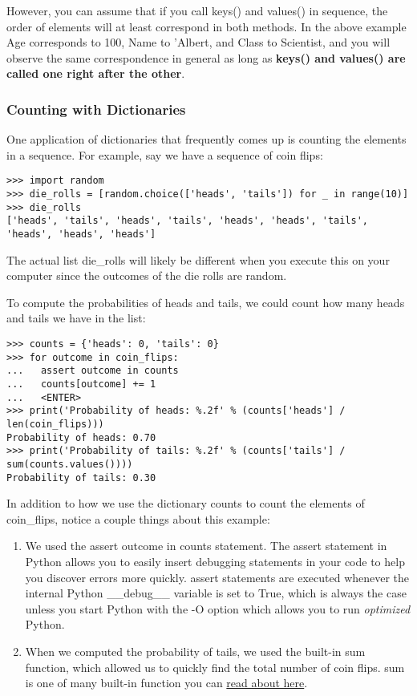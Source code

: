 However, you can assume that if you call keys() and values() in
sequence, the order of elements will at least correspond in both
methods. In the above example Age corresponds to 100, Name to 'Albert,
and Class to Scientist, and you will observe the same correspondence in
general as long as \textbf{keys() and values() are called one right
after the other}.

\subsubsection{Counting with
Dictionaries}\label{counting-with-dictionaries}

One application of dictionaries that frequently comes up is counting the
elements in a sequence. For example, say we have a sequence of coin
flips:

\begin{verbatim}
>>> import random
>>> die_rolls = [random.choice(['heads', 'tails']) for _ in range(10)]
>>> die_rolls
['heads', 'tails', 'heads', 'tails', 'heads', 'heads', 'tails', 'heads', 'heads', 'heads']
\end{verbatim}

The actual list die\_rolls will likely be different when you execute
this on your computer since the outcomes of the die rolls are random.

To compute the probabilities of heads and tails, we could count how many
heads and tails we have in the list:

\begin{verbatim}
>>> counts = {'heads': 0, 'tails': 0}
>>> for outcome in coin_flips:
...   assert outcome in counts
...   counts[outcome] += 1
...   <ENTER>
>>> print('Probability of heads: %.2f' % (counts['heads'] / len(coin_flips)))
Probability of heads: 0.70
>>> print('Probability of tails: %.2f' % (counts['tails'] / sum(counts.values())))
Probability of tails: 0.30
\end{verbatim}

In addition to how we use the dictionary counts to count the elements of
coin\_flips, notice a couple things about this example:

\begin{enumerate}
\tightlist
\item
  We used the assert outcome in counts statement. The assert statement
  in Python allows you to easily insert debugging statements in your
  code to help you discover errors more quickly. assert statements are
  executed whenever the internal Python \_\_debug\_\_ variable is set to
  True, which is always the case unless you start Python with the -O
  option which allows you to run \emph{optimized} Python.
\item
  When we computed the probability of tails, we used the built-in sum
  function, which allowed us to quickly find the total number of coin
  flips. sum is one of many built-in function you can
  \href{https://docs.python.org/2/library/functions.html}{read about
  here}.
\end{enumerate}

